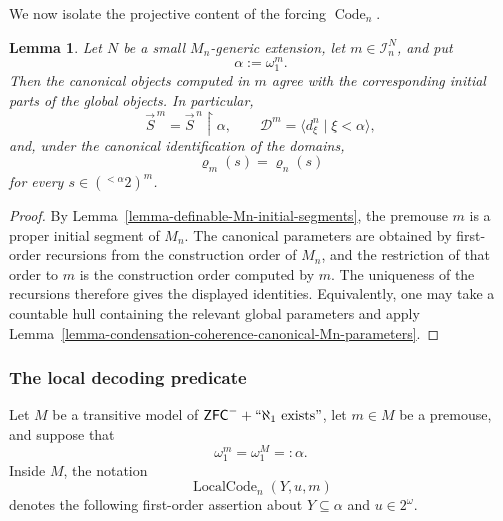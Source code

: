 \documentclass[a4paper,11pt]{article}
\newtheorem{lemma}[theorem]{Lemma}
\newcommand{\ZFCminus}{\mathsf{ZFC}^{-}}
\begin{document}
We now isolate the projective content of the forcing
$\operatorname{Code}_n$.  

\begin{lemma}
\label{lemma-coherence-lower-part-approximations-Mn}
Let $N$ be a small $M_n$-generic extension, let
$m\in\mathcal I_n^N$, and put
\[
   \alpha:=\omega_1^m.
\]
Then the canonical objects computed in $m$ agree with the corresponding
initial parts of the global objects.  In particular,
\[
   \vec S^{\,m}=\vec S^{\,n}\restriction\alpha,
   \qquad
   \mathcal D^m
      =\langle d^n_\xi\mid\xi<\alpha\rangle,
\]
and, under the canonical identification of the domains,
\[
   \varrho_m(s)=\varrho_n(s)
\]
for every $s\in({}^{<\alpha}2)^m$.
\end{lemma}

\begin{proof}
By Lemma~\ref{lemma-definable-Mn-initial-segments}, the premouse $m$ is a
proper initial segment of $M_n$.  The canonical parameters are obtained by
first-order recursions from the construction order of $M_n$, and the
restriction of that order to $m$ is the construction order computed by $m$.
The uniqueness of the recursions therefore gives the displayed identities.
Equivalently, one may take a countable hull containing the relevant global
parameters and apply
Lemma~\ref{lemma-condensation-coherence-canonical-Mn-parameters}.
\end{proof}

\subsubsection*{The local decoding predicate}

Let $M$ be a transitive model of
$\ZFCminus+``\aleph_1\text{ exists}"$, let $m\in M$ be a premouse, and suppose
that
\[
   \omega_1^m=\omega_1^M=:\alpha.
\]
Inside $M$, the notation
\[
   \operatorname{LocalCode}_n(Y,u,m)
\]
denotes the following first-order assertion about
$Y\subseteq\alpha$ and $u\in2^\omega$.
\end{document}
